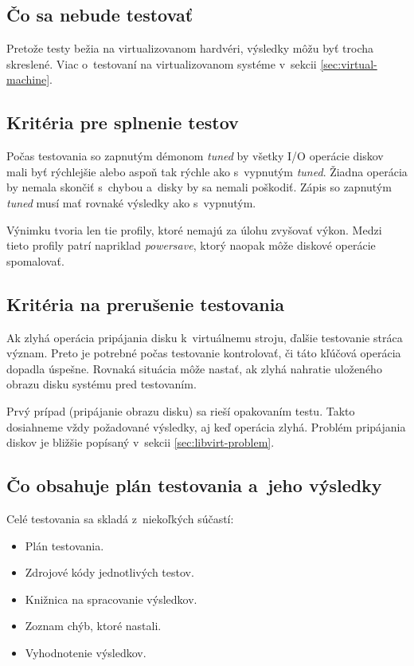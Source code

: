 \subsection*{Čo sa nebude testovať}

Pretože testy bežia na virtualizovanom hardvéri, výsledky môžu byť trocha
skreslené. Viac o~testovaní na virtualizovanom systéme v~sekcii
\ref{sec:virtual-machine}.

\subsection*{Kritéria pre splnenie testov}

Počas testovania so zapnutým démonom \emph{tuned} by všetky I/O operácie diskov
mali byť rýchlejšie alebo aspoň tak rýchle ako s~vypnutým \emph{tuned}. Žiadna
operácia by nemala skončiť s~chybou a~disky by sa nemali poškodiť. Zápis so
zapnutým \emph{tuned} musí mať rovnaké výsledky ako s~vypnutým.

Výnimku tvoria len tie profily, ktoré nemajú za úlohu zvyšovať výkon. Medzi
tieto profily patrí napriklad \emph{powersave}, ktorý naopak môže diskové
operácie spomalovať.

\subsection*{Kritéria na prerušenie testovania}

Ak zlyhá operácia pripájania disku k~virtuálnemu stroju, ďalšie testovanie
stráca význam. Preto je potrebné počas testovanie kontrolovať, či táto kľúčová
operácia dopadla úspešne. Rovnaká situácia môže nastať, ak zlyhá nahratie
uloženého obrazu disku systému pred testovaním.

Prvý prípad (pripájanie obrazu disku) sa rieší opakovaním testu. Takto
dosiahneme vždy požadované výsledky, aj keď operácia zlyhá. Problém pripájania
diskov je bližšie popísaný v~sekcii \ref{sec:libvirt-problem}.

\subsection*{Čo obsahuje plán testovania a~jeho výsledky}

Celé testovania sa skladá z~niekoľkých súčastí:

\begin{itemize}
    \item Plán testovania.
    \item Zdrojové kódy jednotlivých testov.
    \item Knižnica na spracovanie výsledkov.
    \item Zoznam chýb, ktoré nastali.
    \item Vyhodnotenie výsledkov.
\end{itemize}

